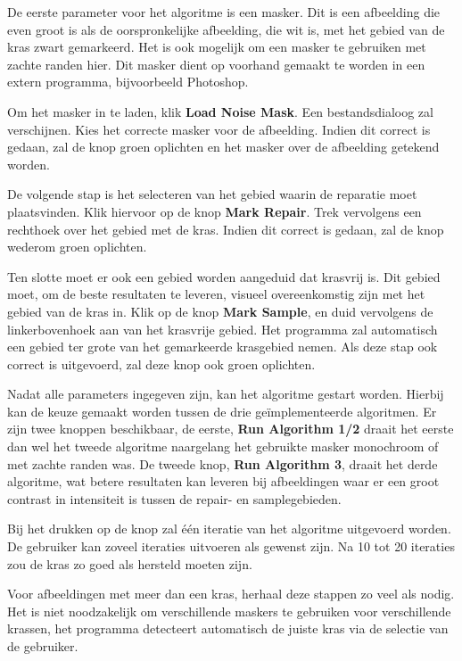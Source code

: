 \documentclass[a4paper,14pt]{extarticle}
\begin{document}
De eerste parameter voor het algoritme is een masker. Dit is een afbeelding die
even groot is als de oorspronkelijke afbeelding, die wit is, met het gebied van
de kras zwart gemarkeerd. Het is ook mogelijk om een masker te gebruiken met
zachte randen hier. Dit masker dient op voorhand gemaakt te worden in een
extern programma, bijvoorbeeld Photoshop.

Om het masker in te laden, klik \textbf{Load Noise Mask}. Een bestandsdialoog
zal verschijnen. Kies het correcte masker voor de afbeelding. Indien dit
correct is gedaan, zal de knop groen oplichten en het masker over de afbeelding
getekend worden. 

De volgende stap is het selecteren van het gebied waarin de reparatie moet
plaatsvinden. Klik hiervoor op de knop \textbf{Mark Repair}. Trek vervolgens
een rechthoek over het gebied met de kras. Indien dit correct is gedaan, zal de
knop wederom groen oplichten.

Ten slotte moet er ook een gebied worden aangeduid dat krasvrij is. Dit gebied
moet, om de beste resultaten te leveren, visueel overeenkomstig zijn met het
gebied van de kras in. Klik op de knop \textbf{Mark Sample}, en duid vervolgens
de linkerbovenhoek aan van het krasvrije gebied. Het programma zal automatisch
een gebied ter grote van het gemarkeerde krasgebied nemen. Als deze stap ook
correct is uitgevoerd, zal deze knop ook groen oplichten.

Nadat alle parameters ingegeven zijn, kan het algoritme gestart worden.
Hierbij kan de keuze gemaakt worden tussen de drie ge\"implementeerde
algoritmen. Er zijn twee knoppen beschikbaar, de eerste, 
\textbf{Run Algorithm 1/2} draait het eerste dan wel het tweede algoritme
naargelang het gebruikte masker monochroom of met zachte randen was. De tweede
knop, \textbf{Run Algorithm 3}, draait het derde algoritme, wat betere
resultaten kan leveren bij afbeeldingen waar er een groot contrast in
intensiteit is tussen de repair- en samplegebieden.

Bij het drukken op de knop zal \'e\'en iteratie van het algoritme uitgevoerd
worden. De gebruiker kan zoveel iteraties uitvoeren als gewenst zijn. Na 10 tot
20 iteraties zou de kras zo goed als hersteld moeten zijn.

Voor afbeeldingen met meer dan een kras, herhaal deze stappen zo veel als
nodig. Het is niet noodzakelijk om verschillende maskers te gebruiken voor
verschillende krassen, het programma detecteert automatisch de juiste kras via
de selectie van de gebruiker.
\end{document}
